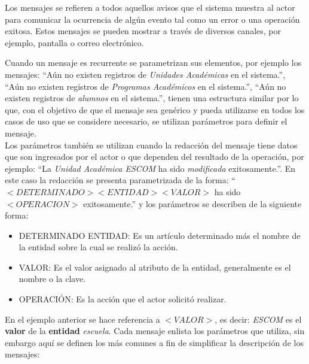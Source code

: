 
Los mensajes se refieren a todos aquellos avisos que el sistema muestra al actor para comunicar la ocurrencia de algún evento tal como un error o una operación exitosa. Estos mensajes se pueden mostrar a través de diversos canales, por ejemplo, pantalla o correo electrónico.


Cuando un mensaje es recurrente se parametrizan sus elementos, por ejemplo los mensajes: ``Aún no existen registros de \textit{Unidades Académicas} en el sistema.'', ``Aún no existen registros de \textit{Programas Académicos} en el sistema.'', 
``Aún no existen registros de \textit{alumnos} en el sistema.'', tienen una estructura similar 
por lo que, con el objetivo de que el mensaje sea genérico y pueda utilizarse en todos los casos de uso que se considere necesario, se utilizan parámetros para definir el mensaje.\\

Los parámetros también se utilizan cuando la redacción del mensaje tiene datos que son ingresados por el actor o que dependen del resultado de la operación, por ejemplo: 
``La \textit{Unidad Académica ESCOM} ha sido \textit{modificada} exitosamente.''. En este caso la redacción se presenta parametrizada de la forma: ``$<DETERMINADO> <ENTIDAD> <VALOR>$ ha sido $<OPERACION>$ exitosamente.'' y los parámetros se describen de la siguiente forma:

\begin{itemize}
	\item DETERMINADO ENTIDAD: Es un artículo determinado más el nombre de la entidad sobre la cual se realizó la acción.
	\item VALOR: Es el valor asignado al atributo de la entidad, generalmente es el nombre o la clave.
	\item OPERACIÓN: Es la acción que el actor solicitó realizar.
\end{itemize}

En el ejemplo anterior se hace referencia a $<VALOR>$, es decir: \textit{ESCOM} es el \textbf{valor} de la \textbf{entidad} \textit{escuela}. Cada mensaje enlista los parámetros  que utiliza, sin embargo aquí se definen los más comunes a fin de simplificar la descripción de los mensajes:

